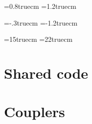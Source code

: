 \documentclass[11pt,a4paper]{report}
\renewcommand{\baselinestretch}{0.5}
\begin{document}
%
\baselineskip=0.8truecm
\parindent=1.2truecm



\headheight=12pt
\footskip=48pt
\hoffset=-.3truecm          %
\voffset=-1.2truecm

\textwidth=15truecm
\textheight=22truecm


\setcounter{page}{0}

\tableofcontents  









\chapter{Shared code}


\chapter{Couplers}





\end{document}
